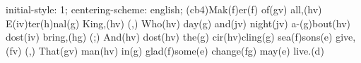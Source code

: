 initial-style: 1;
centering-scheme: english;
(cb4)Mak(f)er(f) of(gv) all,(hv) E(iv)ter(h)nal(g) King,(hv) (,)
Who(hv) day(g) and(jv) night(jv) a-(g)bout(hv) dost(iv) bring,(hg) (;)
And(hv) dost(hv) the(g) cir(hv)cling(g) sea(f)sons(e) give,(fv) (,)
That(gv) man(hv) in(g) glad(f)some(e) change(fg) may(e) live.(d)